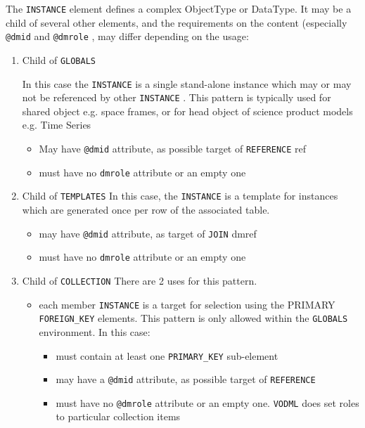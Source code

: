 The \texttt{INSTANCE} element defines a complex ObjectType or DataType.
It may be a child of several other elements, and the requirements on
the content (especially  \texttt{@dmid} and  \texttt{@dmrole} , may differ depending on
the usage:


\begin{enumerate}
\item Child of \texttt{GLOBALS}

   In this case the \texttt{INSTANCE} is a single stand-alone instance which
   may or may not be referenced by other \texttt{INSTANCE} . This pattern is typically used for 
   shared object e.g. space frames, or for head object of science product models e.g. Time Series
  \begin{itemize}
     \item May have  \texttt{@dmid} attribute, as possible target of \texttt{REFERENCE} ref
     \item must have no  \texttt{dmrole} attribute or an empty one
  \end{itemize}  
     
\item Child of \texttt{TEMPLATES} 
  In this case, the \texttt{INSTANCE} is a template for instances which
  are generated once per row of the associated table.  
  \begin{itemize}
     \item may have  \texttt{@dmid} attribute, as target of \texttt{JOIN} dmref
     \item must have no  \texttt{dmrole} attribute or an empty one
  \end{itemize}  

\item Child of \texttt{COLLECTION} 
  There are 2 uses for this pattern.  
  \begin{itemize}
     \item each member \texttt{INSTANCE} is a target for selection using
           the PRIMARY \texttt{FOREIGN\_KEY} elements. This pattern is only 
           allowed within the \texttt{GLOBALS} environment. In this case:             
           \begin{itemize}
             \item must contain at least one \texttt{PRIMARY\_KEY} sub-element
             \item may have a  \texttt{@dmid} attribute, as possible target of \texttt{REFERENCE}              
             \item must have no  \texttt{@dmrole} attribute or an empty one. \texttt{VODML} does set roles to particular collection items
           \end{itemize}


\end{itemize}
\end{enumerate}

